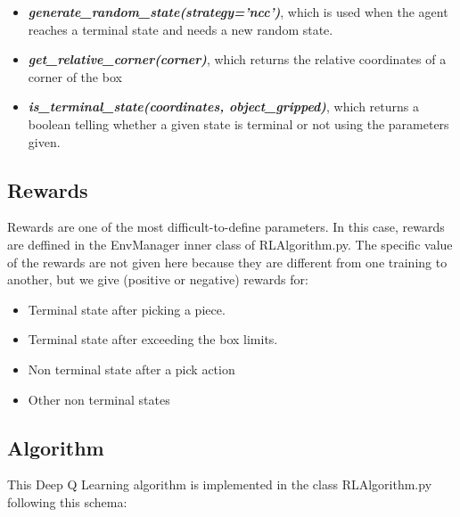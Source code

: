 			\begin{itemize}
				\item[\textendash]\textbf{\textit{generate\_random\_state(strategy='ncc')}}, which is used when the agent reaches a terminal state and needs a new random state.
				\item[\textendash]\textbf{\textit{get\_relative\_corner(corner)}}, which returns the relative coordinates of a corner of the box
				\item[\textendash]\textbf{\textit{is\_terminal\_state(coordinates, object\_gripped)}}, which returns a boolean telling whether a given state is terminal or not using the parameters given.
			\end{itemize}
			
			
		\subsection{Rewards}
			Rewards are one of the most difficult-to-define parameters. In this case, rewards are deffined in the EnvManager inner class of RLAlgorithm.py. The specific value of the rewards are not given here because they are different from one training to another, but we give (positive or negative) rewards for:
			
			\begin{itemize}
				\item[\textendash]Terminal state after picking a piece.
				\item[\textendash]Terminal state after exceeding the box limits.
				\item[\textendash]Non terminal state after a pick action
				\item[\textendash]Other non terminal states
			\end{itemize}
			
		\subsection{Algorithm}
						
			This Deep Q Learning algorithm is implemented in the class RLAlgorithm.py following this schema:
			
